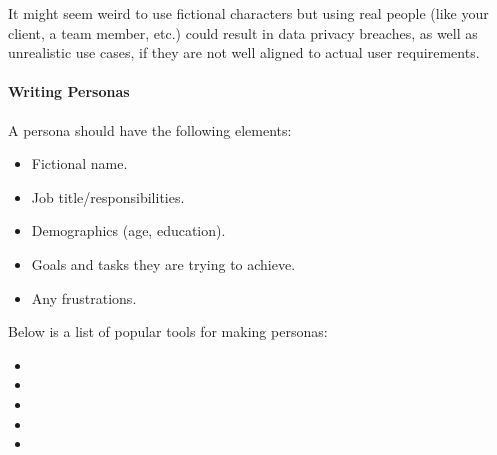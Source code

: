 \documentclass[letterpaper,10pt,english]{jupyterBook}
\begin{document}
\sphinxAtStartPar
{}

\sphinxAtStartPar
{}

\sphinxAtStartPar
It might seem weird to use fictional characters but using real people
(like your client, a team member, etc.) could result in data privacy
breaches, as well as unrealistic use cases, if they are not well aligned
to actual user requirements.


\paragraph{Writing Personas}
\label{\detokenize{chapter_8/requirements_elicitation:writing-personas}}
\sphinxAtStartPar
A persona should have the following elements:
\begin{itemize}
\item {} 
\sphinxAtStartPar
Fictional name.

\item {} 
\sphinxAtStartPar
Job title/responsibilities.

\item {} 
\sphinxAtStartPar
Demographics (age, education).

\item {} 
\sphinxAtStartPar
Goals and tasks they are trying to achieve.

\item {} 
\sphinxAtStartPar
Any frustrations.

\end{itemize}

\sphinxAtStartPar
Below is a list of popular tools for making personas:
\begin{itemize}
\item {} 
\sphinxAtStartPar
{}

\item {} 
\sphinxAtStartPar
{}

\item {} 
\sphinxAtStartPar
{}

\item {} 
\sphinxAtStartPar
{}

\item {} 
\sphinxAtStartPar
{}

\end{itemize}
\end{document}
